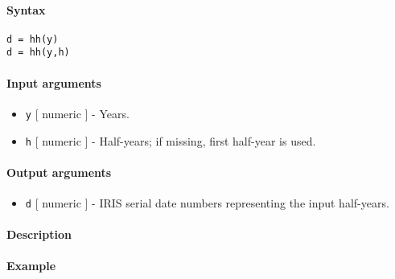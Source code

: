 


	\paragraph{Syntax}\label{syntax}

\begin{verbatim}
d = hh(y)
d = hh(y,h)
\end{verbatim}

\paragraph{Input arguments}\label{input-arguments}

\begin{itemize}
\item
  \texttt{y} {[} numeric {]} - Years.
\item
  \texttt{h} {[} numeric {]} - Half-years; if missing, first half-year
  is used.
\end{itemize}

\paragraph{Output arguments}\label{output-arguments}

\begin{itemize}
\itemsep1pt\parskip0pt
\item
  \texttt{d} {[} numeric {]} - IRIS serial date numbers representing the
  input half-years.
\end{itemize}

\paragraph{Description}\label{description}

\paragraph{Example}\label{example}


